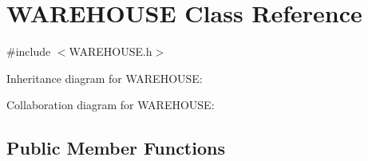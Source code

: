 \hypertarget{class_w_a_r_e_h_o_u_s_e}{}\section{W\+A\+R\+E\+H\+O\+U\+SE Class Reference}
\label{class_w_a_r_e_h_o_u_s_e}


{\ttfamily \#include $<$W\+A\+R\+E\+H\+O\+U\+S\+E.\+h$>$}



Inheritance diagram for W\+A\+R\+E\+H\+O\+U\+SE\+:


Collaboration diagram for W\+A\+R\+E\+H\+O\+U\+SE\+:
\subsection*{Public Member Functions}
